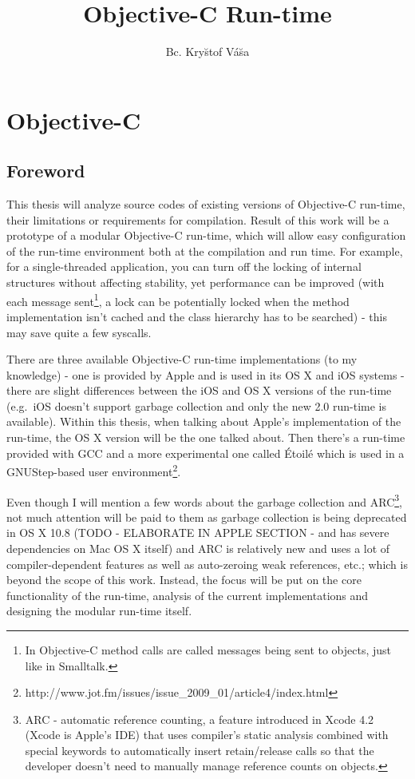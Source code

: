 \documentclass[a4paper, 11pt, fleqn]{book}
\begin{document}
\title{Objective-C Run-time}
\author{Bc. Kry\u{s}tof V\'{a}\u{s}a}
\date{}
\maketitle 

\chapter{Objective-C}
\section{Foreword}

This thesis will analyze source codes of existing versions of Objective-C run-time, their limitations or requirements for compilation. Result of this work will be a prototype of a modular Objective-C run-time, which will allow easy configuration of the run-time environment both at the compilation and run time. For example, for a single-threaded application, you can turn off the locking of internal structures without affecting stability, yet performance can be improved (with each message sent\footnote{In Objective-C method calls are called messages being sent to objects, just like in Smalltalk.}, a lock can be potentially locked when the method implementation isn't cached and the class hierarchy has to be searched) - this may save quite a few syscalls.

There are three available Objective-C run-time implementations (to my knowledge) - one is provided by Apple and is used in its OS X and iOS systems - there are slight differences between the iOS and OS X versions of the run-time (e.g.\ iOS doesn't support garbage collection and only the new 2.0 run-time is available). Within this thesis, when talking about Apple's implementation of the run-time, the OS X version will be the one talked about. Then there's a run-time provided with GCC and a more experimental one called \'{E}toil\'{e} which is used in a GNUStep-based user environment\footnote{http://www.jot.fm/issues/issue\_2009\_01/article4/index.html}.

Even though I will mention a few words about the garbage collection and ARC\footnote{ARC - automatic reference counting, a feature introduced in Xcode 4.2 (Xcode is Apple's IDE) that uses compiler's static analysis combined with special keywords to automatically insert retain/release calls so that the developer doesn't need to manually manage reference counts on objects.}, not much attention will be paid to them as garbage collection is being deprecated in OS X 10.8 (TODO - ELABORATE IN APPLE SECTION - and has severe dependencies on Mac OS X itself) and ARC is relatively new and uses a lot of compiler-dependent features as well as auto-zeroing weak references, etc.; which is beyond the scope of this work. Instead, the focus will be put on the core functionality of the run-time, analysis of the current implementations and designing the modular run-time itself.
  
\end{document}
